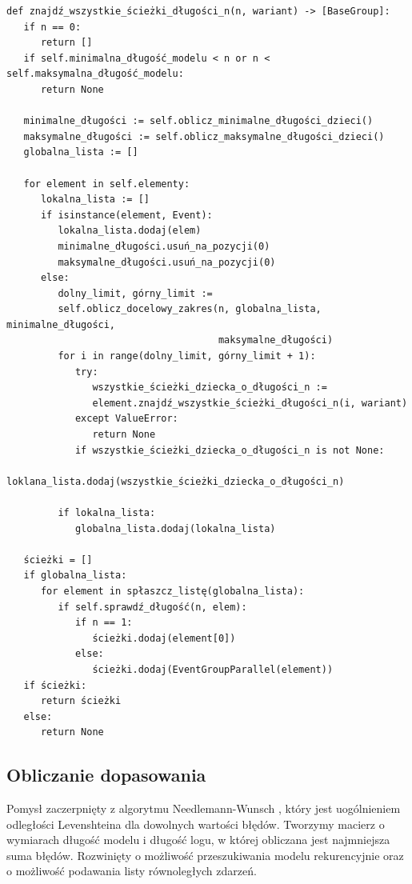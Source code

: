\lstset{caption=Wyszukiwanie procesów o długości n, captionpos=b}
\lstset{label=src:get_n_length, frame=single}
\begin{lstlisting}[escapeinside=``]
def znajdź_wszystkie_ścieżki_długości_n(n, wariant) -> [BaseGroup]:
   if n == 0:
      return []
   if self.minimalna_długość_modelu < n or n < self.maksymalna_długość_modelu:
      return None

   minimalne_długości := self.oblicz_minimalne_długości_dzieci()
   maksymalne_długości := self.oblicz_maksymalne_długości_dzieci()
   globalna_lista := []

   for element in self.elementy:
      lokalna_lista := []
      if isinstance(element, Event):
         lokalna_lista.dodaj(elem)
         minimalne_długości.usuń_na_pozycji(0)
         maksymalne_długości.usuń_na_pozycji(0)
      else:
         dolny_limit, górny_limit := 
         self.oblicz_docelowy_zakres(n, globalna_lista, minimalne_długości, 
                                     maksymalne_długości)
         for i in range(dolny_limit, górny_limit + 1):
            try:
               wszystkie_ścieżki_dziecka_o_długości_n := 
               element.znajdź_wszystkie_ścieżki_długości_n(i, wariant)
            except ValueError:
               return None
            if wszystkie_ścieżki_dziecka_o_długości_n is not None:
               loklana_lista.dodaj(wszystkie_ścieżki_dziecka_o_długości_n)

         if lokalna_lista:
            globalna_lista.dodaj(lokalna_lista)

   ścieżki = []
   if globalna_lista:
      for element in spłaszcz_listę(globalna_lista):
         if self.sprawdź_długość(n, elem):
            if n == 1:
               ścieżki.dodaj(element[0])
            else:
               ścieżki.dodaj(EventGroupParallel(element))
   if ścieżki:
      return ścieżki
   else:
      return None
\end{lstlisting}

\subsection{Obliczanie dopasowania}
Pomysł zaczerpnięty z algorytmu Needlemann-Wunsch \cite{ea252fd3937a4a309a5e07e61e5531a7}, który jest uogólnieniem odległości Levenshteina dla dowolnych wartości błędów. Tworzymy macierz o wymiarach długość modelu i długość logu, w której obliczana jest najmniejsza suma błędów. Rozwinięty o możliwość przeszukiwania modelu rekurencyjnie oraz o możliwość podawania listy równoległych zdarzeń.

